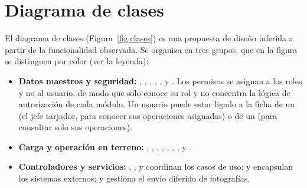 \chapter{Diagrama de clases}
\label{cap:clases}

\sloppy

El diagrama de clases (Figura~\ref{fig:clases}) es una propuesta de diseño inferida a partir de la
funcionalidad observada. Se organiza en tres grupos, que en la figura se distinguen por color
(ver la leyenda):

\begin{itemize}
    \item \textbf{Datos maestros y seguridad:} , , ,
          , ,  y . Los permisos
          se asignan a los roles y no al usuario, de modo que  solo conoce su rol y
          no concentra la lógica de autorización de cada módulo. Un usuario puede estar ligado a la
          ficha de un  (el jefe tarjador, para conocer sus operaciones asignadas)
          o de un  (para consultar solo sus operaciones).
    \item \textbf{Carga y operación en terreno:} , ,
          , , , ,
          ,  y .
    \item \textbf{Controladores y servicios:} ,
          ,  y  coordinan
          los casos de uso;  y  encapsulan los sistemas
          externos; y  gestiona el envío diferido de fotografías.
\end{itemize}

